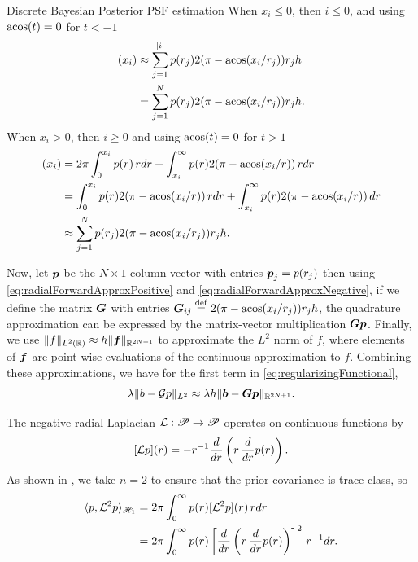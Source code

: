 \begin{chapter}{Discrete Bayesian Posterior PSF estimation}
When $x_i \le 0$, then $i \le 0$, and using $\operatorname*{acos}(t) = 0$ for $t<-1$
\begin{align}
  [\G p](x_i) 
    &\approx \sum_{j=1}^{|i|} p(r_j)2(\pi - \acos(x_i/r_j)) r_jh \nonumber\\
    &= \sum_{j=1}^{N} p(r_j)2(\pi - \acos(x_i/r_j)) r_jh. \label{eq:radialForwardApproxPositive}
\end{align}
When $x_i > 0$, then $i \ge 0$ and using $\operatorname*{acos}(t) = 0$ for $t>1$ 
\begin{align}
  [\G p](x_i) 
    &= 2\pi \int_0^{x_i} p(r)\,rdr + \int_{x_i}^\infty p(r)2(\pi - \acos(x_i/r))\,rdr\nonumber \\
    &= \int_0^{x_i} p(r) 2(\pi - \acos(x_i/r))\,rdr + \int_{x_i}^\infty p(r)2(\pi - \acos(x_i/r))\,dr\nonumber \\
    &\approx \sum_{j=1}^{N} p(r_j)2(\pi - \acos(x_i/r_j)) r_jh. \label{eq:radialForwardApproxNegative}
\end{align}

Now, let $\mbox{\boldmath$p$}$ be the $N\times 1$ column vector with entries $\mbox{\boldmath$p$}_j = p(r_j)$ 
then using \eqref{eq:radialForwardApproxPositive} and \eqref{eq:radialForwardApproxNegative}, if we define the matrix $\mbox{\boldmath$G$}$ with entries $\mbox{\boldmath$G$}_{ij} \stackrel{\rm def}{=} 2(\pi - \operatorname*{acos}(x_i/r_j)) r_j h$, the quadrature approximation can be expressed by the matrix-vector multiplication $\mbox{\boldmath$G$} \mbox{\boldmath$p$}$.
Finally, we use $\|f\|_{L^2(\mathbb R)} \approx h\|\mbox{\boldmath$f$}\|_{\mathbb R^{2N+1}}$ to approximate the $L^2$ norm of $f$, where elements of $\mbox{\boldmath$f$}$ are point-wise evaluations of the continuous approximation to $f$.
Combining these approximations, we have for the first term in \eqref{eq:regularizingFunctional},
\begin{equation}
  \lambda \|b - \mathcal G p\|_{L^2} \approx \lambda h \|\mbox{\boldmath$b$} - \mbox{\boldmath$G$} \mbox{\boldmath$p$}\|_{\mathbb R^{2N+1}}.
\end{equation}

The negative radial Laplacian $\mathcal L: \mathscr P \to \mathscr P$ operates on continuous functions by
\begin{equation} \label{eq:radialLaplacian}
  [\mathcal L p](r) = -r^{-1}\frac{d}{dr}\left(r \,\frac{d}{dr}p(r)\right). 
\end{equation}
As shown in , we take $n=2$ to ensure that the prior covariance is trace class, so
\begin{align} 
  \langle p, \mathcal L^2 p \rangle_{\mathscr H_1}
  &= 2\pi\int_0^\infty p(r) [\mathcal L^2 p](r) \, rdr \nonumber\\
  &= 2\pi\int_0^\infty p(r) \left[\frac{d}{dr}\left(r \,\frac{d}{dr}p(r)\right)\right]^2 \, r^{-1}dr.
  \label{eq:infiniteRadialInnerProduct}
\end{align}


\end{chapter}
